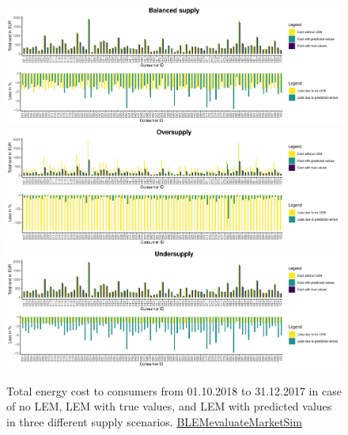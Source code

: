 \begin{figure}[htbp]
    \centering
    \includegraphics[width=\textwidth]{thesis/graphs/marketsimulation/totalenergycost.pdf}\\\vspace{.6cm}
    \includegraphics[width=\textwidth]{thesis/graphs/marketsimulation/totalenergycost_oversupply.pdf}\\\vspace{.6cm}
    \includegraphics[width=\textwidth]{thesis/graphs/marketsimulation/totalenergycost_undersupply.pdf}
    \caption[Total energy cost to consumers in different supply scenarios]{Total energy cost to consumers from 01.10.2018 to 31.12.2017 in case of no LEM, LEM with true values, and LEM with predicted values in three different supply scenarios. \quantnet\href{}{BLEMevaluateMarketSim}}
    \label{Fig:total_energycost}
\end{figure}
%

